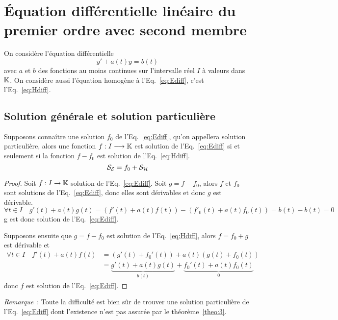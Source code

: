 \section{Équation différentielle linéaire du premier ordre avec second membre}
\label{sec:equadifflinpremierordresecondmembre}
On considère l'équation différentielle
\begin{equation}
y'+a(t)y=b(t) \label{eq:Ediff}
\end{equation}
avec $a$ et $b$ des fonctions au moins continues sur l'intervalle réel $I$ à valeurs dans $\mathbb{K}$.
On considère aussi l'équation homogène à l'Eq.~\eqref{eq:Ediff}, c'est l'Eq.~\eqref{eq:Hdiff}.
\subsection{Solution générale et solution particulière}
\label{subsec:solutiongeneraleetpart}
\begin{theo}\label{theo:3}
Supposons connaître une solution $f_0$ de l'Eq.~\eqref{eq:Ediff}, qu'on appellera solution particulière, alors une fonction $f:I \longrightarrow \mathbb{K}$ est solution de l'Eq.~\eqref{eq:Ediff} si et seulement si la fonction $f-f_0$ est solution de l'Eq.~\eqref{eq:Hdiff}.
\begin{equation}
\mathcal{S}_{\mathcal{E}}=f_0 + \mathcal{S}_{\mathcal{H}}
\end{equation}
\end{theo}
\begin{proof}
  Soit $f:I \rightarrow \mathbb{K}$ solution de l'Eq.~\eqref{eq:Ediff}. Soit $g=f-f_0$, alors $f$ et $f_0$ sont solutions de l'Eq.~\eqref{eq:Ediff}, donc elles sont dérivables et donc $g$ est dérivable.
  \begin{equation}
    \forall t \in I \quad g'(t)+a(t)g(t)=(f'(t)+a(t)f(t))-(f'_0(t)+a(t)f_0(t))=b(t)-b(t)=0
  \end{equation}
g est donc solution de l'Eq.~\eqref{eq:Ediff}.

Supposons ensuite que $g=f-f_0$ est solution de l'Eq.~\eqref{eq:Hdiff}, alors $f=f_0+g$ est dérivable et
\begin{align}
  \forall t \in I \quad f'(t)+a(t)f(t)&=(g'(t)+f_0'(t)) + a(t)(g(t)+f_0(t)) \\ &=\underbrace{g'(t)+a(t)g(t)}_{b(t)} + \underbrace{f_0'(t)+a(t)f_0(t)}_{0}
\end{align}
donc $f$ est solution de l'Eq.~\eqref{eq:Ediff}.
\end{proof}

\emph{Remarque}~: Toute la difficulté est bien sûr de trouver une solution particulière de l'Eq.~\eqref{eq:Ediff} dont l'existence n'est pas assurée par le théorème~\ref{theo:3}.


